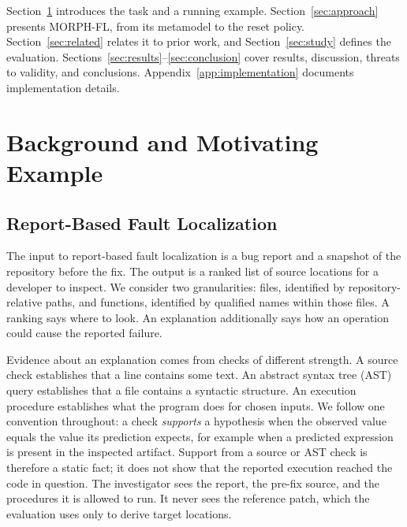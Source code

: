 \documentclass[letterpaper,journal]{IEEEtran}
\newcommand{\tool}{MORPH-FL}
\begin{document}
Section~\ref{sec:background} introduces the task and a running example. Section~\ref{sec:approach} presents \tool{}, from its metamodel to the reset policy. Section~\ref{sec:related} relates it to prior work, and Section~\ref{sec:study} defines the evaluation. Sections~\ref{sec:results}--\ref{sec:conclusion} cover results, discussion, threats to validity, and conclusions. Appendix~\ref{app:implementation} documents implementation details.

\section{Background and Motivating Example}\label{sec:background}
\subsection{Report-Based Fault Localization}\label{sec:problem}
The input to report-based fault localization is a bug report and a snapshot of the repository before the fix. The output is a ranked list of source locations for a developer to inspect. We consider two granularities: files, identified by repository-relative paths, and functions, identified by qualified names within those files. A ranking says where to look. An explanation additionally says how an operation could cause the reported failure.

Evidence about an explanation comes from checks of different strength. A source check establishes that a line contains some text. An abstract syntax tree (AST) query establishes that a file contains a syntactic structure. An execution procedure establishes what the program does for chosen inputs. We follow one convention throughout: a check \emph{supports} a hypothesis when the observed value equals the value its prediction expects, for example when a predicted expression is present in the inspected artifact. Support from a source or AST check is therefore a static fact; it does not show that the reported execution reached the code in question. The investigator sees the report, the pre-fix source, and the procedures it is allowed to run. It never sees the reference patch, which the evaluation uses only to derive target locations.
\end{document}

